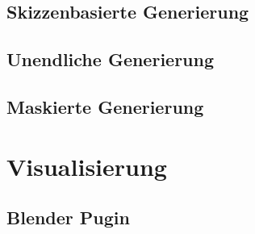 \subsection {Skizzenbasierte Generierung}
\subsection {Unendliche Generierung}
\subsection {Maskierte Generierung}

\section {Visualisierung}
\subsection {Blender Pugin}
